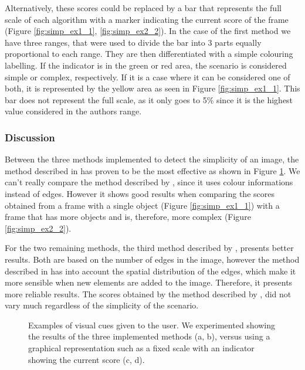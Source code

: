 Alternatively, these scores could be replaced by a bar that represents the full scale of each algorithm with a marker indicating the current score of the frame (Figure \ref{fig:simp_ex1_1}, \ref{fig:simp_ex2_2}).
In the case of the first method \cite{luo2008photo} we have three ranges, that were used to divide the bar into 3 parts equally proportional to each range. They are then differentiated with a simple colouring labelling. If the indicator is in the green or red area, the scenario is considered simple or complex, respectively. If it is a case where it can be considered one of both, it is represented by the yellow area as seen in Figure \ref{fig:simp_ex1_1}. This bar does not represent the full scale, as it only goes to 5\% since it is the highest value considered in the authors range.

\subsubsection{Discussion}
\label{subsub:simp_disc}

Between the three methods implemented to detect the simplicity of an image, the method described in \cite{ke2006design} has proven to be the most effective as shown in Figure \ref{fig:simp_ex}. We can't really compare the method described by \citeauthor{luo2008photo} \cite{luo2008photo}, since it uses colour informations instead of edges. However it shows good results when comparing the scores obtained from a frame with a single object (Figure \ref{fig:simp_ex1_1}) with a frame that has more objects and is, therefore, more complex (Figure \ref{fig:simp_ex2_2}).

For the two remaining methods, the third method described by \citeauthor{ke2006design}, presents better results. Both are based on the number of edges in the image, however the method described in \cite{ke2006design} has into account the spatial distribution of the edges, which make it more sensible when new elements are added to the image. Therefore, it presents more reliable results. The scores obtained by the method described by \citeauthor{kaoautomatic} \cite{kaoautomatic}, did not vary much regardless of the simplicity of the scenario.

\begin{figure}[htb]
	\centering
  	\caption{Examples of visual cues given to the user. We experimented showing the results of the three implemented methods (a, b), versus using a graphical representation such as a fixed scale with an indicator showing the current score (c, d).}
	\label{fig:simp_ex}
\end{figure}

